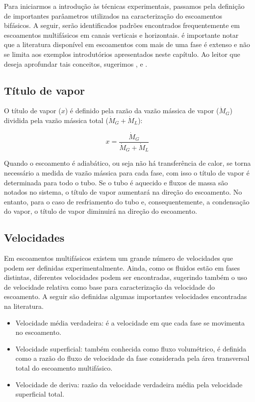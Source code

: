 Para iniciarmos a introdução às técnicas experimentais, passamos
pela definição de importantes parâametros utilizados na
caracterização do escoamentos bifásicos. A seguir, serão
identificados padrões encontrados frequentemente em escoamentos
multifásicos em canais verticais e horizontais. é importante notar
que a literatura disponível em escoamentos com mais de uma fase é
extenso e não se limita aos exemplos introdutórios apresentados
neste capítulo. Ao leitor que deseja aprofundar tais conceitos,
sugerimos \cite{collier1996}, \cite{whalley1987} e \cite{carey2007}.

\subsection{Título de vapor}

O título de vapor ($x$) é definido pela razão da vazão
mássica de vapor ($\dot{M}_G$) dividida pela vazão mássica total
($\dot{M}_G+\dot{M}_L$):

\begin{equation}
	x = \frac{\dot{M}_G}{\dot{M}_G+\dot{M}_L}
\end{equation}

Quando o escoamento é adiabático, ou seja não há transferência
de calor, se torna necessário a medida de vazão mássica para cada
fase, com isso o título de vapor é determinada para todo o tubo. Se
o tubo é aquecido e fluxos de massa são notados no sistema, o
título de vapor aumentará na direção do escoamento. No
entanto, para o caso de resfriamento do tubo e, consequentemente, a
condensação do vapor, o título de vapor diminuirá na direção do escoamento.

\subsection{Velocidades}

Em escoamentos multifásicos existem um grande número de velocidades
que podem ser definidas experimentalmente. Ainda, como os fluidos
estão em fases distintas, diferentes velocidades podem ser
encontradas, sugerindo também o uso de velocidade relativa como base
para caracterização da velocidade do escoamento. A seguir são
definidas algumas importantes velocidades encontradas na literatura.

\begin{itemize}
	\item Velocidade média verdadeira: é a velocidade em que cada fase
	se movimenta no escoamento.
	\item Velocidade superficial: também conhecida como fluxo
	volumétrico, é definida como a razão do fluxo de velocidade da fase
	considerada pela área transversal total do escoamento multifásico.
	\item Velocidade de deriva: razão da velocidade verdadeira média
	pela velocidade superficial total.
\end{itemize}

